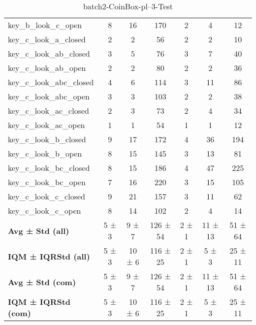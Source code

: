 \begin{table}[!ht]
\begin{tabular}{l|ccc|ccc}
key\_b\_look\_c\_open & 8 & 16 & 170 & 2 & 4 & 12 \\
key\_c\_look\_a\_closed & 2 & 2 & 56 & 2 & 2 & 10 \\
key\_c\_look\_ab\_closed & 3 & 5 & 76 & 3 & 7 & 40 \\
key\_c\_look\_ab\_open & 2 & 2 & 80 & 2 & 2 & 36 \\
key\_c\_look\_abc\_closed & 4 & 6 & 114 & 3 & 11 & 86 \\
key\_c\_look\_abc\_open & 3 & 3 & 103 & 2 & 2 & 38 \\
key\_c\_look\_ac\_closed & 2 & 3 & 73 & 2 & 4 & 34 \\
key\_c\_look\_ac\_open & 1 & 1 & 54 & 1 & 1 & 12 \\
key\_c\_look\_b\_closed & 9 & 17 & 172 & 4 & 36 & 194 \\
key\_c\_look\_b\_open & 8 & 15 & 145 & 3 & 13 & 81 \\
key\_c\_look\_bc\_closed & 8 & 15 & 186 & 4 & 47 & 225 \\
key\_c\_look\_bc\_open & 7 & 16 & 220 & 3 & 15 & 105 \\
key\_c\_look\_c\_closed & 9 & 21 & 157 & 3 & 11 & 62 \\
key\_c\_look\_c\_open & 8 & 14 & 102 & 2 & 4 & 14 \\
\hline
\textbf{Avg ± Std (all)} & 5 ± 3 & 9 ± 7 & 126 ± 54 & 2 ± 1 & 11 ± 13 & 51 ± 64 \\
\textbf{IQM ± IQRStd (all)} & 5 ± 3 & 10 ± 6 & 116 ± 25 & 2 ± 1 & 5 ± 3 & 25 ± 11 \\
\textbf{Avg ± Std (com)} & 5 ± 3 & 9 ± 7 & 126 ± 54 & 2 ± 1 & 11 ± 13 & 51 ± 64 \\
\textbf{IQM ± IQRStd (com)} & 5 ± 3 & 10 ± 6 & 116 ± 25 & 2 ± 1 & 5 ± 3 & 25 ± 11 \\
\end{tabular}
\caption{batch2-CoinBox-pl--3-Test}
\label{tab:batch2_CoinBox_pl__3_comparison_test}
\end{table}
